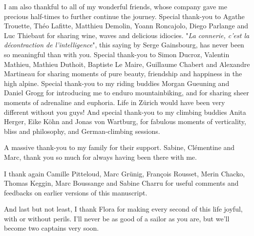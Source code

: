 I am also thankful to all of my wonderful friends, whose company gave me precious half-times to further continue the journey.
% 
Special thank-you to Agathe Trouette, Théo Lafitte, Matthieu Demolin, Yoann Roncajolo, Diego Parlange and Luc Thiebaut for sharing wine, waves and delicious idiocies. "\textit{La connerie, c'est la décontraction de l'intelligence}", this saying by Serge Gainsbourg, has never been so meaningful than with you.
% 
Special thank-you to Simon Ducroz, Valentin Mathieu, Mathieu Duthoit, Baptiste Le Maire, Guillaume Chabert and Alexandre Martineau for sharing moments of pure beauty, friendship and happiness in the high alpine.
% 
Special thank-you to my riding buddies Morgan Gueuning and Daniel Grogg for introducing me to enduro mountainbiking, and for sharing sheer moments of adrenaline and euphoria. Life in Zürich would have been very different without you guys! 
% 
And special thank-you to my climbing buddies Anita Herger, Eike Köhn and Jonas von Wartburg, for fabulous moments of verticality, bliss and philosophy, and German-climbing sessions.

A massive thank-you to my family for their support. Sabine, Clémentine and Marc, thank you so much for always having been there with me.

I thank again Camille Pitteloud, Marc Grünig, François Rousset, Merin Chacko, Thomas Keggin, Marc Boussange and Sabine Charru for useful comments and feedbacks on earlier versions of this manuscript.

% 
And last but not least, I thank Flora for making every second of this life joyful, with or without perils.
% 
I'll never be as good of a sailor as you are, but we'll become two captains very soon.